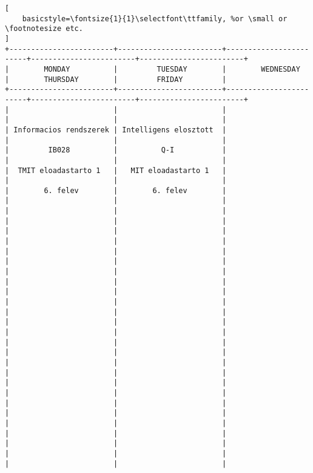 \begin{lstlisting}[
    basicstyle=\fontsize{1}{1}\selectfont\ttfamily, %or \small or \footnotesize etc.
]
+------------------------+------------------------+------------------------+------------------------+------------------------+
|        MONDAY          |         TUESDAY        |        WEDNESDAY       |        THURSDAY        |         FRIDAY         |
+------------------------+------------------------+------------------------+------------------------+------------------------+
|                        |                        |                        |                        |                        | 
| Informacios rendszerek | Intelligens elosztott  |                        |                        |                        | 
|         IB028          |          Q-I           |                        |                        |                        | 
|  TMIT eloadastarto 1   |   MIT eloadastarto 1   |                        |                        |                        | 
|        6. felev        |        6. felev        |                        |                        |                        | 
|                        |                        |                        |                        |                        | 
|                        |                        |                        |                        |                        | 
|                        |                        |                        |                        |                        | 
|                        |                        |                        |                        |                        | 
|                        |                        |                        |                        |                        | 
|                        |                        |                        |                        |                        | 
|                        |                        |                        |                        |                        | 
|                        |                        |                        |                        |                        | 
|                        |                        |                        |                        |                        | 
|                        |                        |                        |                        |                        | 
|                        |                        |                        |                        |                        | 
|                        |                        |                        |                        |                        | 
|                        |                        |                        |                        |                        | 

\end{lstlisting}
